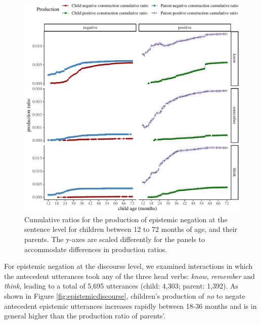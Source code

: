 \documentclass[
  man,floatsintext]{apa6}
\begin{document}
\begin{figure}[H]

{\centering \includegraphics{neg_construction_article_files/figure-latex/epistemic-1} 

}

\caption{Cumulative ratios for the production of epistemic negation at the sentence level for children between 12 to 72 months of age, and their parents. The y-axes are scaled differently for the panels to accommodate differences in production ratios.}\label{fig:epistemic}
\end{figure}

For epistemic negation at the discourse level, we examined interactions in which the antecedent utterances took any of the three head verbs: \emph{know}, \emph{remember} and \emph{think}, leading to a total of 5,695 utterances (child: 4,303; parent: 1,392). As shown in Figure \ref{fig:epistemicdiscourse}, children's production of \emph{no} to negate antecedent epistemic utterances increases rapidly between 18-36 months and is in general higher than the production ratio of parents'.
\end{document}
